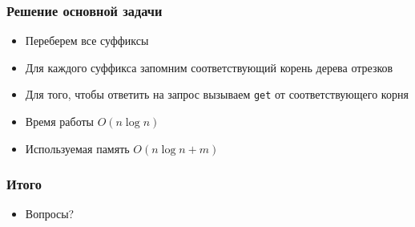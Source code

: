 \begin{frame}
  \frametitle{Решение основной задачи}
  \begin{itemize}
    \item Переберем все суффиксы
    \item Для каждого суффикса запомним соответствующий корень дерева отрезков
    \item Для того, чтобы ответить на запрос вызываем \texttt{get} от соответствующего корня
    \item Время работы $O(n \log n)$
    \item Используемая память $O(n \log n + m)$
  \end{itemize}
\end{frame}

\begin{frame}
  \frametitle{Итого}
  \begin{itemize}
    \item Вопросы?
  \end{itemize}
\end{frame}